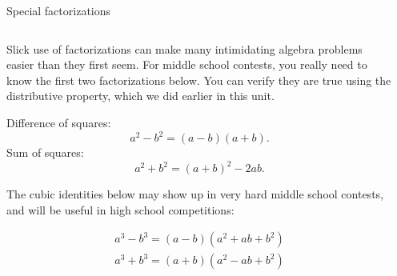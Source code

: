 \documentclass[9pt,aspectratio=169]{beamer}
\begin{document}
\begin{frame}{Special factorizations}
  \begin{columns}[T]
    \begin{column}{0.5\textwidth}
      Slick use of factorizations can make many intimidating algebra problems easier than they first seem.  For middle school contests, you really need to know the first two factorizations below.  You can verify they are true using the distributive property, which we did earlier in this unit.
      \begin{definition}
        Difference of squares: 
        \[ a^2 - b^2 = (a - b)(a + b). \]
        Sum of squares: 
        \[ a^2 + b^2 = (a + b)^2 - 2ab. \]
        \vspace*{-\intextsep}
      \end{definition}
      The cubic identities below may show up in very hard middle school contests, and will be useful in high school competitions:
      \begin{definition}
        \vspace*{-0.5\intextsep}
        \begin{gather*}          
          a^3 - b^3 = (a - b)(a^2 + ab + b^2)\\
          a^3 + b^3 = (a + b)(a^2 - ab + b^2)
        \end{gather*}
        \vspace*{-\intextsep}
      \end{definition}
    \end{column}
    \begin{column}{0.5\textwidth}


    \end{column}
  \end{columns}
\end{frame}
\end{document}
